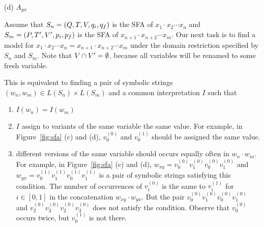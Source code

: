 \documentclass[sigplan,review,anonymous]{acmart}\settopmatter{printfolios=true,printccs=false,printacmref=false}
\begin{document}
\begin{figure*}
\begin{minipage}[t]{0.28\textwidth}
	
	\centering
	(d) $A_{yx}$
	\end{minipage}

	\caption{Symbolic flat automata of $x$, $y$, $xy$ and $yx$}
	\label{fig:sfa}
\end{figure*}

Assume that $S_n=(Q,T,V,q_i,q_f)$ is the SFA of $x_1\cdot x_2 \cdots x_n$ and $S_m=(P,T',V',p_i,p_f)$ is the SFA of $x_{n+1}\cdot x_{n+2} \cdots x_m$. Our next task is to find a model for $x_1\cdot x_2 \cdots x_n = x_{n+1}\cdot x_{n+2} \cdots x_m$ under the domain restriction specified by $S_n$ and $S_m$. 
Note that $V \cap V' =\emptyset$, because all variables will be renamed to some fresh variable. 


This is equivalent to finding a pair of symbolic strings $(w_n,w_m) \in L(S_n)\times L(S_m)$ and a common interpretation $I$ such that 
\begin{enumerate}
	\item $I(w_n)=I(w_m)$
	\item $I$ assign to variants of the same variable the same value. For example, in Figure~\ref{fig:sfa} (c) and (d), $v_0^{(0)}$ and $v_0^{(1)}$ should be assigned the same value.
	\item different versions of the same variable should occurs equally often in $w_n\cdot w_m$. For example, in Figure~\ref{fig:sfa} (c) and (d), $w_{xy}=v_0^{(0)}v_1^{(0)}v_0^{(0)}v_1^{(0)}$ and $w_{yx}=v_0^{(1)}v_1^{(1)}v_0^{(1)}v_1^{(1)}$ is a pair of symbolic strings satisfying this condition. The number of occurrences of $v_i^{(0)}$ is the same to $v_i^{(1)}$ for $i\in[0,1]$ in the concatenation $w_{xy}\cdot w_{yx}$.
	But the pair $v_0^{(0)}v_1^{(0)}v_0^{(0)}v_1^{(0)}$ and $v_2^{(0)}v_3^{(0)}v_2^{(0)}v_3^{(0)}$ does not satisfy the condition. Observe that $v_0^{(0)}$ occurs twice, but $v_0^{(1)}$ is not there.
\end{enumerate}
\end{document}
